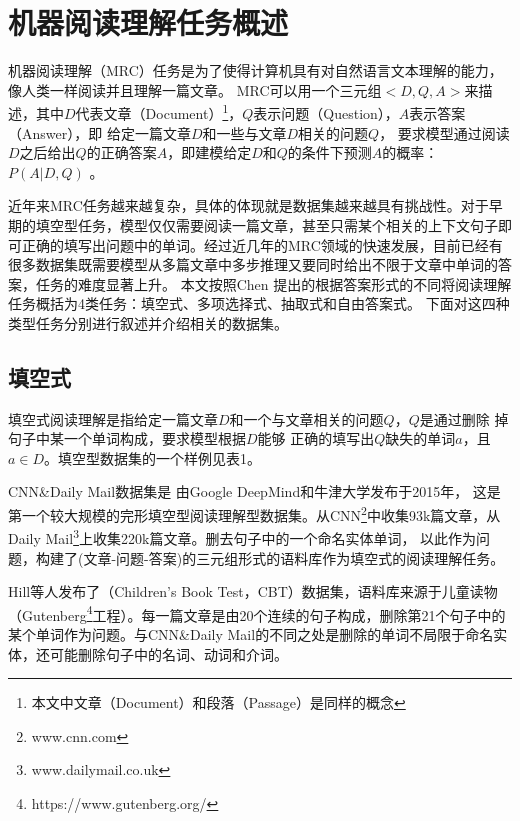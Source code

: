 \section{机器阅读理解任务概述}

机器阅读理解（MRC）任务是为了使得计算机具有对自然语言文本理解的能力，像人类一样阅读并且理解一篇文章。
MRC可以用一个三元组$<D,Q,A>$来描述，其中$D$代表文章（Document）\footnote{本文中文章（Document）和段落（Passage）是同样的概念}，$Q$表示问题（Question），$A$表示答案（Answer），即
给定一篇文章$D$和一些与文章$D$相关的问题$Q$，
要求模型通过阅读$D$之后给出$Q$的正确答案$A$，即建模给定$D$和$Q$的条件下预测$A$的概率：$P(A|D,Q)$
。

近年来MRC任务越来越复杂，具体的体现就是数据集越来越具有挑战性。对于早期的填空型任务，模型仅仅需要阅读一篇文章，甚至只需某个相关的上下文句子即可正确的填写出问题中的单词。经过近几年的MRC领域的快速发展，目前已经有很多数据集既需要模型从多篇文章中多步推理又要同时给出不限于文章中单词的答案，任务的难度显著上升。
本文按照Chen
提出的根据答案形式的不同将阅读理解任务概括为4类任务：填空式、多项选择式、抽取式和自由答案式。
下面对这四种类型任务分别进行叙述并介绍相关的数据集。



\subsection{填空式}
填空式阅读理解是指给定一篇文章$D$和一个与文章相关的问题$Q$，$Q$是通过删除
掉句子中某一个单词构成，要求模型根据$D$能够
正确的填写出$Q$缺失的单词$a$，且$a\in D$。填空型数据集的一个样例见表1。

CNN\&Daily Mail数据集是
由Google DeepMind和牛津大学发布于2015年，
这是第一个较大规模的完形填空型阅读理解型数据集。从CNN\footnote{www.cnn.com\label{cnn}}中收集93k篇文章，从
Daily Mail\footnote{www.dailymail.co.uk\label{daily mail}}上收集220k篇文章。删去句子中的一个命名实体单词，
以此作为问题，构建了(文章-问题-答案)的三元组形式的语料库作为填空式的阅读理解任务。

Hill等人发布了（Children's Book Test，CBT）数据集，语料库来源于儿童读物（Gutenberg\footnote{https://www.gutenberg.org/\label{cbt}}工程）。每一篇文章是由20个连续的句子构成，删除第21个句子中的某个单词作为问题。与CNN\&Daily Mail的不同之处是删除的单词不局限于命名实体，还可能删除句子中的名词、动词和介词。

